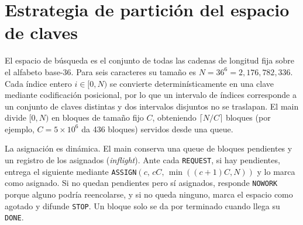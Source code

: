 \section{Estrategia de partición del espacio de claves}\label{sec:partition}
El espacio de búsqueda es el conjunto de todas las cadenas de longitud fija sobre el alfabeto base-36. Para seis caracteres su tamaño es $N = 36^6 = 2{,}176{,}782{,}336$. Cada índice entero $i \in [0, N)$ se convierte determinísticamente en una clave mediante codificación posicional, por lo que un intervalo de índices corresponde a un conjunto de claves distintas y dos intervalos disjuntos no se traslapan. El main divide $[0,N)$ en bloques de tamaño fijo $C$, obteniendo $\lceil N/C \rceil$ bloques (por ejemplo, $C = 5\times10^6$ da 436 bloques) servidos desde una queue.

La asignación es dinámica. El main conserva una queue de bloques pendientes y un registro de los asignados (\emph{inflight}). Ante cada \texttt{REQUEST}, si hay pendientes, entrega el siguiente mediante \texttt{ASSIGN}$(c,\, cC,\, \min((c{+}1)C, N))$ y lo marca como asignado. Si no quedan pendientes pero sí asignados, responde \texttt{NOWORK} porque alguno podría reencolarse, y si no queda ninguno, marca el espacio como agotado y difunde \texttt{STOP}. Un bloque solo se da por terminado cuando llega su \texttt{DONE}.
